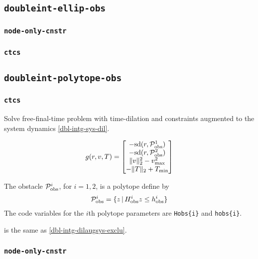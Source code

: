 \documentclass[11pt,a4paper]{article}
\begin{document}
\subsection{\texttt{doubleint-ellip-obs}}

\subsubsection{\texttt{node-only-cnstr}}

\subsubsection{\texttt{ctcs}}

\subsection{\texttt{doubleint-polytope-obs}}

\subsubsection{\texttt{ctcs}}

Solve free-final-time problem with time-dilation and constraints augmented to the system dynamics \eqref{dbl-intg-sys-dil}.

\begin{align*}
    g(r,v,T) = \begin{bmatrix}
                  -\mathrm{sd}(r,\mathcal{P}^1_{\mathrm{obs}})\\
                  -\mathrm{sd}(r,\mathcal{P}^2_{\mathrm{obs}})\\
                  \|v\|_2^2 - v_{\max}^2\\
                  -\|T\|_2 + T_{\min}
               \end{bmatrix}
\end{align*}

The obstacle $\mathcal{P}^i_{\mathrm{obs}}$, for $i=1,2$, is a polytope define by
\begin{align*}
    \mathcal{P}^i_{\mathrm{obs}} = \{z\,|\,H^i_{\mathrm{obs}}z \le h^i_{\text{obs}}\}
\end{align*}
The code variables for the $i$th polytope parameters are \verb|Hobs{i}| and \verb|hobs{i}|.

 is the same as \eqref{dbl-intg-dilaugsys-exclu}.

\subsubsection{\texttt{node-only-cnstr}}
\end{document}
